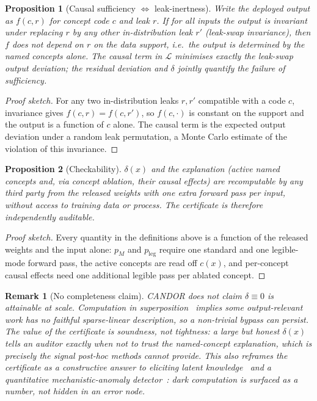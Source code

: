 \documentclass[11pt]{article}
\newtheorem{proposition}{Proposition}
\newtheorem{remark}{Remark}
\begin{document}
\begin{proposition}[Causal sufficiency $\Leftrightarrow$ leak-inertness]
\label{prop:causal}
Write the deployed output as $f(c,r)$ for concept code $c$ and leak $r$. If for all
inputs the output is invariant under replacing $r$ by any other in-distribution leak
$r'$ (leak-swap invariance), then $f$ does not depend on $r$ on the data support, i.e.\
the output is determined by the named concepts alone. The causal term in
$\mathcal{L}$ minimises exactly the leak-swap output deviation; the residual deviation
and $\delta$ jointly quantify the failure of sufficiency.
\end{proposition}
\begin{proof}[Proof sketch]
For any two in-distribution leaks $r,r'$ compatible with a code $c$, invariance gives
$f(c,r)=f(c,r')$, so $f(c,\cdot)$ is constant on the support and the output is a
function of $c$ alone. The causal term is the expected output deviation under a random
leak permutation, a Monte Carlo estimate of the violation of this invariance.
\end{proof}

\begin{proposition}[Checkability]
\label{prop:check}
$\delta(x)$ and the explanation (active named concepts and, via concept ablation, their
causal effects) are recomputable by any third party from the released weights with one
extra forward pass per input, without access to training data or process. The
certificate is therefore independently auditable.
\end{proposition}
\begin{proof}[Proof sketch]
Every quantity in the definitions above is a function of the released weights and the
input alone: $p_M$ and $p_{\mathrm{leg}}$ require one standard and one legible-mode
forward pass, the active concepts are read off $c(x)$, and per-concept causal effects
need one additional legible pass per ablated concept.
\end{proof}

\begin{remark}[No completeness claim]
\label{rem:incomplete}
CANDOR does \emph{not} claim $\delta\equiv0$ is attainable at scale. Computation in
superposition~\citep{hanni2024compsuperposition} implies some output-relevant work has
no faithful sparse-linear description, so a non-trivial bypass can persist. The value of
the certificate is \emph{soundness, not tightness}: a large but honest $\delta(x)$ tells
an auditor exactly when \emph{not} to trust the named-concept explanation, which is
precisely the signal post-hoc methods cannot provide. This also reframes the
certificate as a constructive answer to eliciting latent knowledge~\citep{christiano2021elk}
and a quantitative mechanistic-anomaly detector~\citep{roger2023measurement}: dark
computation is surfaced as a number, not hidden in an error node.
\end{remark}
\end{document}

